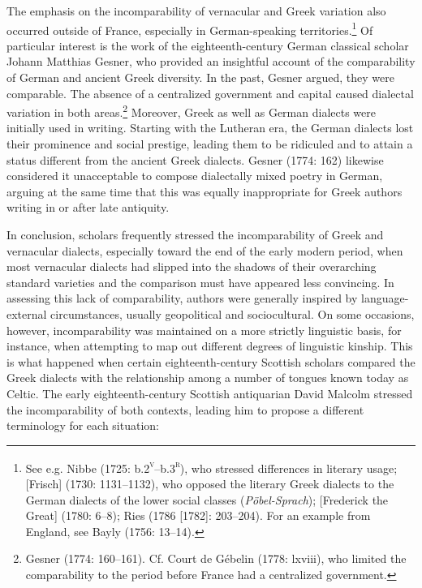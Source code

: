 \begin{styleStandard}
The emphasis on the incomparability of vernacular and Greek variation also occurred outside of France, especially in German-speaking territories.\footnote{ See e.g. Nibbe (1725: b.2\textsc{\textsuperscript{v}}\textsc{–}b.3\textsc{\textsuperscript{r}}), who stressed differences in literary usage; [Frisch] (1730: 1131–1132), who opposed the literary Greek dialects to the German dialects of the lower social classes (\textit{Pöbel-Sprach}); [Frederick the Great] (1780: 6–8); Ries (1786 [1782]: 203–204). For an example from England, see Bayly (1756: 13–14).} Of particular interest is the work of the eighteenth-century German classical scholar Johann Matthias Gesner, who provided an insightful account of the comparability of German and ancient Greek diversity. In the past, Gesner argued, they were comparable. The absence of a centralized government and capital caused dialectal variation in both areas.\footnote{ Gesner (1774: 160–161). Cf. Court de Gébelin (1778: lxviii), who limited the comparability to the period before France had a centralized government.} Moreover, Greek as well as German dialects were initially used in writing. Starting with the Lutheran era, the German dialects lost their prominence and social prestige, leading them to be ridiculed and to attain a status different from the ancient Greek dialects. Gesner (1774: 162) likewise considered it unacceptable to compose dialectally mixed poetry in German, arguing at the same time that this was equally inappropriate for Greek authors writing in or after late antiquity.
\end{styleStandard}

\begin{styleStandard}
In conclusion, scholars frequently stressed the incomparability of Greek and vernacular dialects, especially toward the end of the early modern period, when most vernacular dialects had slipped into the shadows of their overarching standard varieties and the comparison must have appeared less convincing. In assessing this lack of comparability, authors were generally inspired by language-external circumstances, usually geopolitical and sociocultural. On some occasions, however, incomparability was maintained on a more strictly linguistic basis, for instance, when attempting to map out different degrees of linguistic kinship. This is what happened when certain eighteenth-century Scottish scholars compared the Greek dialects with the relationship among a number of tongues known today as Celtic. The early eighteenth-century Scottish antiquarian David Malcolm stressed the incomparability of both contexts, leading him to propose a different terminology for each situation:
\end{styleStandard}

